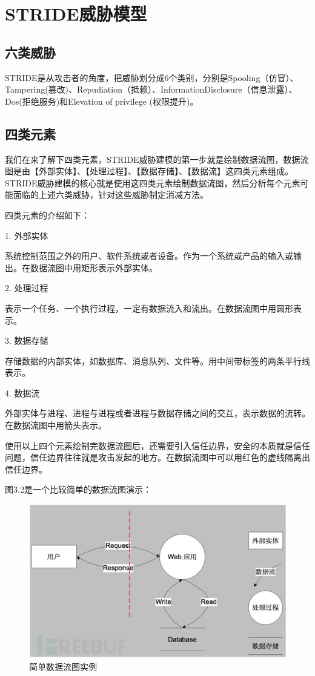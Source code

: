 \section[]{STRIDE威胁模型}
\subsection[]{六类威胁}

STRIDE是从攻击者的角度，把威胁划分成6个类别，分别是Spooling（仿冒）、Tampering(篡改)、Repudiation（抵赖）、InformationDisclosure（信息泄露）、Dos(拒绝服务)和Elevation of privilege (权限提升)。

\subsection[]{四类元素}

我们在来了解下四类元素，STRIDE威胁建模的第一步就是绘制数据流图，数据流图是由【外部实体】、【处理过程】、【数据存储】、【数据流】这四类元素组成。STRIDE威胁建模的核心就是使用这四类元素绘制数据流图，然后分析每个元素可能面临的上述六类威胁，针对这些威胁制定消减方法。

四类元素的介绍如下：

1.  外部实体

系统控制范围之外的用户、软件系统或者设备。作为一个系统或产品的输入或输出。在数据流图中用矩形表示外部实体。

2.  处理过程

表示一个任务、一个执行过程，一定有数据流入和流出。在数据流图中用圆形表示。

3.  数据存储

存储数据的内部实体，如数据库、消息队列、文件等。用中间带标签的两条平行线表示。

4.  数据流

外部实体与进程、进程与进程或者进程与数据存储之间的交互，表示数据的流转。在数据流图中用箭头表示。

使用以上四个元素绘制完数据流图后，还需要引入信任边界，安全的本质就是信任问题，信任边界往往就是攻击发起的地方。在数据流图中可以用红色的虚线隔离出信任边界。

图3.2是一个比较简单的数据流图演示：
\begin{figure}
    \centering
    \includegraphics[scale=0.6]{resources/img/i5.png}
    \caption{简单数据流图实例}
  \end{figure}


